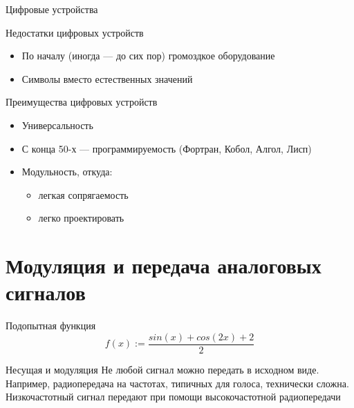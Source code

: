 \documentclass[xetex,aspectratio=43]{beamer}
\begin{document}
\begin{frame}{Цифровые устройства}
\end{frame}

\begin{frame}{Недостатки цифровых устройств}
	\begin{itemize}

		\item
		По началу (иногда --- до сих пор) громоздкое оборудование
		\item
		Символы вместо естественных значений
	\end{itemize}
\end{frame}

\begin{frame}{Преимущества цифровых устройств}
	\begin{itemize}

		\item
		Универсальность
		\item
		С конца 50-х --- программируемость (Фортран, Кобол, Алгол, Лисп)
		\item
		Модульность, откуда:

		\begin{itemize}

			\item
			легкая сопрягаемость
			\item
			легко проектировать
		\end{itemize}
	\end{itemize}
\end{frame}

\section{Модуляция и передача аналоговых сигналов}

\begin{frame}{Подопытная функция}
	\[f(x) := \frac{sin(x) +cos(2x) +2}{2}\]

	\begin{center}
		
	\end{center}
\end{frame}

\begin{frame}{Несущая и модуляция}
	Не любой сигнал можно передать в исходном виде. Например, радиопередача
	на частотах, типичных для голоса, технически сложна. Низкочастотный
	сигнал передают при помощи высокочастотной радиопередачи

	\pause


\end{frame}
\end{document}

